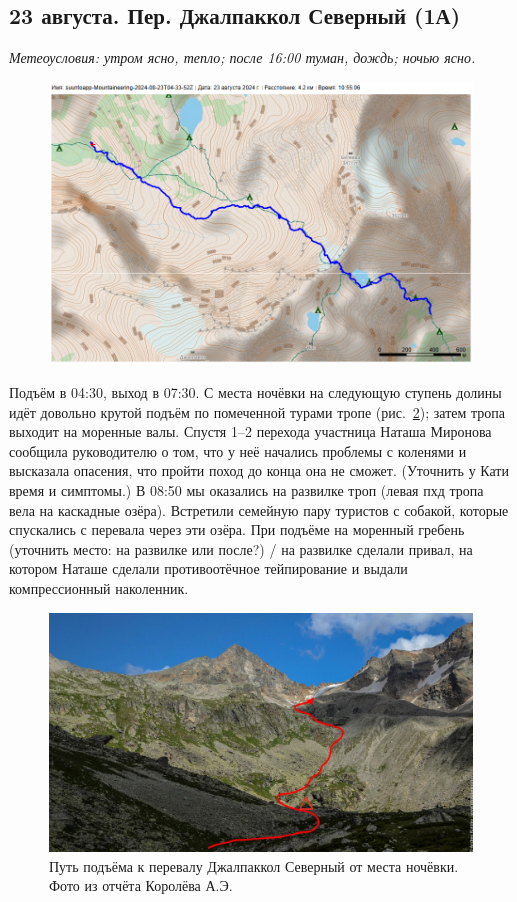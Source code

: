 \subsection{23 августа.  Пер. Джалпаккол Северный (1А)}
\textit{Метеоусловия: утром ясно, тепло; после 16:00 туман, дождь; ночью ясно.}

\begin{figure}[h!]
	\centering
	\includegraphics[angle=0, width=0.7\linewidth]{../pics/mini_maps/23}
	\label{fig:mini_23}
\end{figure}


Подъём в 04:30, выход в 07:30. С места ночёвки на следующую ступень долины идёт довольно крутой подъём по помеченной турами тропе (рис.~\ref{fig:23augstart}); затем тропа выходит на моренные валы. Спустя 1--2 перехода участница Наташа Миронова сообщила руководителю о том, что у неё начались проблемы с коленями и высказала опасения, что пройти поход до конца она не сможет. \alert{(Уточнить у Кати время и симптомы.)} В 08:50 мы оказались на развилке троп (левая пхд тропа вела на каскадные озёра). Встретили семейную пару туристов с собакой, которые спускались с перевала через эти озёра. При подъёме на моренный гребень \alert{(уточнить место: на развилке или после?)} / на развилке сделали привал, на котором Наташе сделали противоотёчное тейпирование и выдали компрессионный наколенник.

\begin{figure}[h!]
	\centering
	\includegraphics[angle=0, width=0.7\linewidth]{../pics/23augstart}
	\caption{Путь подъёма к перевалу Джалпаккол Северный от места ночёвки. Фото из отчёта Королёва А.Э. \cite{Korolyov2018}}
	\label{fig:23augstart}
\end{figure}

